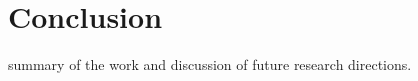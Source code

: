 \chapter{Conclusion}
\label{chap:conclusion}
summary of the work and discussion of future research directions.
